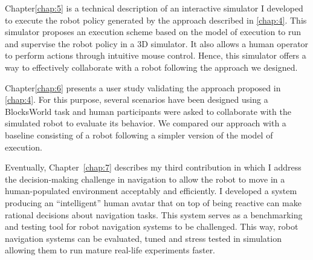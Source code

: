 Chapter\ref{chap:5} is a technical description of an interactive simulator I developed to execute the robot policy generated by the approach described in \ref{chap:4}. This simulator proposes an execution scheme based on the model of execution to run and supervise the robot policy in a 3D simulator. It also allows a human operator to perform actions through intuitive mouse control. Hence, this simulator offers a way to effectively collaborate with a robot following the approach we designed.    

Chapter\ref{chap:6} presents a user study validating the approach proposed in \ref{chap:4}. For this purpose, several scenarios have been designed using a BlocksWorld task and human participants were asked to collaborate with the simulated robot to evaluate its behavior. We compared our approach with a baseline consisting of a robot following a simpler version of the model of execution.

Eventually, Chapter~\ref{chap:7} describes my third contribution in which I address the decision-making challenge in navigation to allow the robot to move in a human-populated environment acceptably and efficiently. I developed a system producing an ``intelligent'' human avatar that on top of being reactive can make rational decisions about navigation tasks. This system serves as a benchmarking and testing tool for robot navigation systems to be challenged. This way, robot navigation systems can be evaluated, tuned and stress tested in simulation allowing them to run mature real-life experiments faster.  






